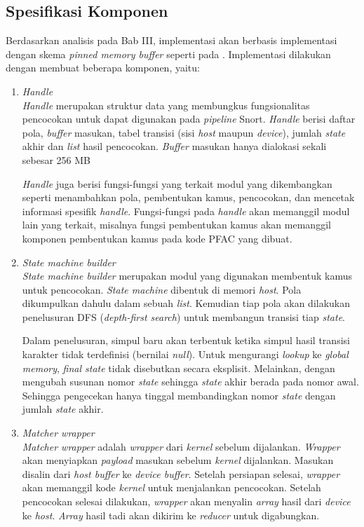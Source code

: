   \subsection{Spesifikasi Komponen}

    Berdasarkan analisis pada Bab III, implementasi akan berbasis implementasi \cite{lin2013} dengan skema \emph{pinned memory buffer} seperti pada \cite{gnort2008}. Implementasi dilakukan dengan membuat beberapa komponen, yaitu:

    \begin{enumerate}

      \item
      \emph{Handle} \\
      \emph{Handle} merupakan struktur data yang membungkus fungsionalitas pencocokan untuk dapat digunakan pada \emph{pipeline} Snort. \emph{Handle} berisi daftar pola, \emph{buffer} masukan, tabel transisi (sisi \emph{host} maupun \emph{device}), jumlah \emph{state} akhir dan \emph{list} hasil pencocokan. \emph{Buffer} masukan hanya dialokasi sekali sebesar 256 MB
      
      \emph{Handle} juga berisi fungsi-fungsi yang terkait modul yang dikembangkan seperti menambahkan pola, pembentukan kamus, pencocokan, dan mencetak informasi spesifik \emph{handle}. Fungsi-fungsi pada \emph{handle} akan memanggil modul lain yang terkait, misalnya fungsi pembentukan kamus akan memanggil komponen pembentukan kamus pada kode PFAC yang dibuat.      

      \item
      \emph{State machine builder} \\
      \emph{State machine builder} merupakan modul yang digunakan membentuk kamus untuk pencocokan. \emph{State machine} dibentuk di memori \emph{host}. Pola dikumpulkan dahulu dalam sebuah \emph{list}. Kemudian tiap pola akan dilakukan penelusuran DFS (\emph{depth-first search}) untuk membangun transisi tiap \emph{state}. 
      
      Dalam penelusuran, simpul baru akan terbentuk ketika simpul hasil transisi karakter tidak terdefinisi (bernilai \emph{null}). Untuk mengurangi \emph{lookup} ke \emph{global memory}, \emph{final state} tidak disebutkan secara eksplisit. Melainkan, dengan mengubah susunan nomor \emph{state} sehingga \emph{state} akhir berada pada nomor awal. Sehingga pengecekan hanya tinggal membandingkan nomor \emph{state} dengan jumlah \emph{state} akhir.

      \item
      \emph{Matcher wrapper} \\
      \emph{Matcher wrapper} adalah \emph{wrapper} dari \emph{kernel} sebelum dijalankan. \emph{Wrapper} akan menyiapkan \emph{payload} masukan sebelum \emph{kernel} dijalankan. Masukan disalin dari \emph{host buffer} ke \emph{device buffer}. Setelah persiapan selesai, \emph{wrapper} akan memanggil kode \emph{kernel} untuk menjalankan pencocokan. Setelah pencocokan selesai dilakukan, \emph{wrapper} akan menyalin \emph{array} hasil dari \emph{device} ke \emph{host}. \emph{Array} hasil tadi akan dikirim ke \emph{reducer} untuk digabungkan.
      

\end{enumerate}
